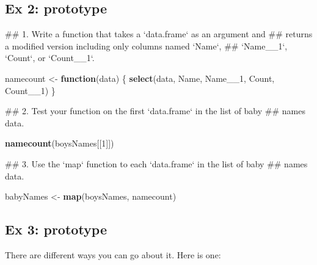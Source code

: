 \documentclass[]{book}
\newenvironment{Shaded}{\begin{snugshade}}{\end{snugshade}}
\newcommand{\KeywordTok}[1]{\textcolor[rgb]{0.13,0.29,0.53}{\textbf{#1}}}
\newcommand{\DecValTok}[1]{\textcolor[rgb]{0.00,0.00,0.81}{#1}}
\newcommand{\StringTok}[1]{\textcolor[rgb]{0.31,0.60,0.02}{#1}}
\newcommand{\ControlFlowTok}[1]{\textcolor[rgb]{0.13,0.29,0.53}{\textbf{#1}}}
\newcommand{\NormalTok}[1]{#1}
\begin{document}
\subsection{Ex 2: prototype}\label{ex-2-prototype-3}

\begin{Shaded}
\begin{Highlighting}[]
\NormalTok{  ## 1. Write a function that takes a `data.frame` as an argument and}
\NormalTok{  ##    returns a modified version including only columns named `Name`,}
\NormalTok{  ##    `Name__1`, `Count`, or `Count__1`.}

\NormalTok{  namecount <-}\StringTok{ }\ControlFlowTok{function}\NormalTok{(data) \{}
      \KeywordTok{select}\NormalTok{(data, Name, Name__}\DecValTok{1}\NormalTok{, Count, Count__}\DecValTok{1}\NormalTok{)}
\NormalTok{  \}}
     
\NormalTok{  ## 2. Test your function on the first `data.frame` in the list of baby}
\NormalTok{  ##    names data.}

  \KeywordTok{namecount}\NormalTok{(boysNames[[}\DecValTok{1}\NormalTok{]])}
  
\NormalTok{  ## 3. Use the `map` function to each `data.frame` in the list of baby}
\NormalTok{  ##    names data.}

\NormalTok{  babyNames <-}\StringTok{ }\KeywordTok{map}\NormalTok{(boysNames, namecount)}
\end{Highlighting}
\end{Shaded}

\subsection{Ex 3: prototype}\label{ex-3-prototype-2}

There are different ways you can go about it. Here is one:
\end{document}
